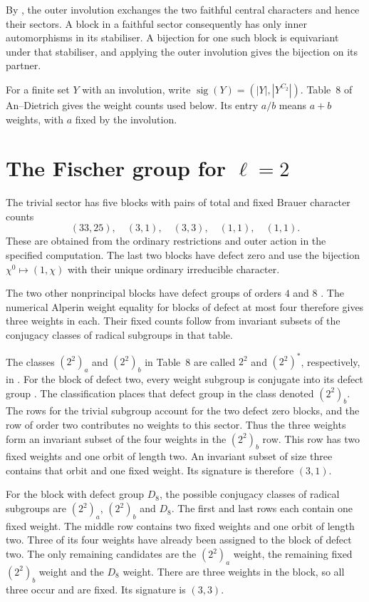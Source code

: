 By \cite[Lemma~4.7]{AnDietrich2012}, the outer involution exchanges the two
faithful central characters and hence their sectors. A block in a faithful sector
consequently has only inner automorphisms in its stabiliser. A bijection for
one such block is equivariant under that stabiliser, and applying the outer
involution gives the bijection on its partner.

For a finite set $Y$ with an involution, write
$\operatorname{sig}(Y)=(|Y|,|Y^{C_2}|)$. Table~8 of An--Dietrich \cite{AnDietrich2012} gives the weight counts used below. Its entry $a/b$
means $a+b$ weights, with $a$ fixed by the involution.

\section{The Fischer group for \texorpdfstring{$\ell=2$}{ell=2}}

The trivial sector has five blocks with pairs of total and fixed Brauer character counts
\[
 (33,25),\quad(3,1),\quad(3,3),\quad(1,1),\quad(1,1).
\]
These are obtained from the ordinary restrictions and outer action
in the specified computation. The last two blocks have defect zero
and use the bijection $\chi^0\mapsto(1,\chi)$ with their unique
ordinary irreducible character.

The two other nonprincipal blocks have defect groups of orders $4$ and $8$
\cite[Lemma~4.2(d)]{AnCannonOBrienUngerFi24}. The numerical Alperin weight
equality for blocks of defect at most four \cite[Theorem~13.7]{Sambale2014}
therefore gives three weights in each. Their fixed counts follow from
invariant subsets of the conjugacy classes of radical subgroups in that table.

The classes $(2^2)_a$ and $(2^2)_b$ in Table~8 are
called $2^2$ and $(2^2)^*$, respectively, in
\cite[Table~2]{AnCannonOBrienUngerFi24}.
For the block of defect two, every weight subgroup is conjugate into its
defect group \cite[Theorem~4.14]{Navarro1998}. The classification places
that defect group in the class denoted $(2^2)_b$. The rows for the trivial
subgroup account for the two defect zero blocks, and the row of order two
contributes no weights to this sector. Thus the three weights form an
invariant subset of the four weights in the $(2^2)_b$ row. This row has two
fixed weights and one orbit of length two. An invariant subset of size three
contains that orbit and one fixed weight. Its signature is therefore
$(3,1)$.

For the block with defect group $D_8$, the possible conjugacy classes of radical subgroups are
$(2^2)_a$, $(2^2)_b$ and $D_8$. The first and last rows each contain one
fixed weight. The middle row contains two fixed weights and one orbit of
length two. Three of its four weights have already been assigned to the
block of defect two. The only remaining candidates are the $(2^2)_a$ weight,
the remaining fixed $(2^2)_b$ weight and the $D_8$ weight. There are three
weights in the block, so all three occur and are fixed. Its signature is
$(3,3)$.

